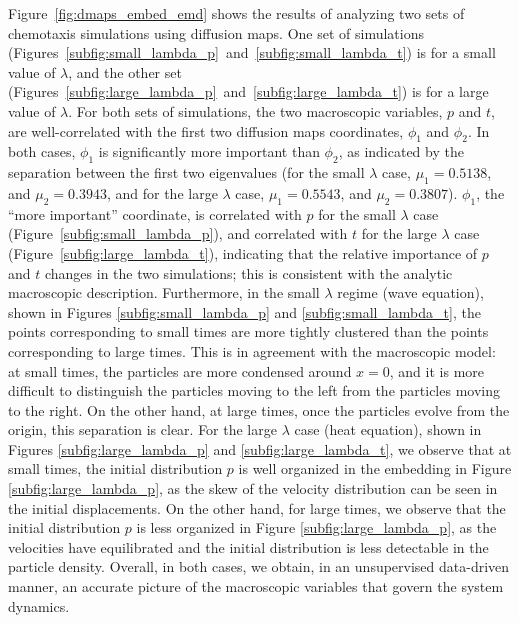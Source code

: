 \documentclass[preprint]{elsarticle}
\begin{document}
Figure~\ref{fig:dmaps_embed_emd} shows the results of analyzing two sets of chemotaxis simulations using diffusion maps. 
%
One set of simulations (Figures~\ref{subfig:small_lambda_p}~and~\ref{subfig:small_lambda_t}) is for a small value of $\lambda$, and the other set (Figures~\ref{subfig:large_lambda_p}~and~\ref{subfig:large_lambda_t}) is for a large value of $\lambda$. 
%
For both sets of simulations, the two macroscopic variables, $p$ and $t$, are well-correlated with the first two diffusion maps coordinates, $\phi_1$ and $\phi_2$. 
%
In both cases, $\phi_1$ is significantly more important than $\phi_2$, as indicated by the separation between the first two eigenvalues (for the small $\lambda$ case, $\mu_1 = 0.5138$, and $\mu_2 = 0.3943$, and for the large $\lambda$ case, $\mu_1 = 0.5543$, and $\mu_2 = 0.3807$).
%
$\phi_1$, the ``more important'' coordinate, is correlated with $p$ for the small $\lambda$ case (Figure~\ref{subfig:small_lambda_p}), and correlated with $t$ for the large $\lambda$ case (Figure~\ref{subfig:large_lambda_t}), indicating that the relative importance of $p$ and $t$ changes in the two simulations;
this is consistent with the analytic macroscopic description. 
%
Furthermore, in the small $\lambda$ regime (wave equation), shown in Figures \ref{subfig:small_lambda_p} and \ref{subfig:small_lambda_t}, the points corresponding to small times are more tightly clustered than the points corresponding to large times.
%
This is in agreement with the macroscopic model: at small times, the particles are more condensed around $x=0$, and it is more difficult to distinguish the particles moving to the left from the particles moving to the right. 
%
On the other hand, at large times, once the particles evolve from the origin, this separation is clear.  
%
For the large $\lambda$ case (heat equation), shown in Figures \ref{subfig:large_lambda_p} and \ref{subfig:large_lambda_t}, we observe that at small times, the initial distribution $p$ is well organized in the embedding in Figure \ref{subfig:large_lambda_p}, as the skew of the velocity distribution can be seen in the initial displacements.
%
On the other hand, for large times, we observe that the initial distribution $p$ is less organized in Figure \ref{subfig:large_lambda_p}, as the velocities have equilibrated and the initial distribution is less detectable in the particle density.
%
Overall, in both cases, we obtain, in an unsupervised data-driven manner, an accurate picture of the macroscopic variables that govern the system dynamics.

\end{document}
